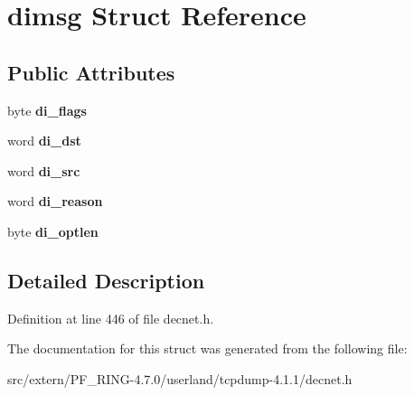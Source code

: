 \hypertarget{structdimsg}{
\section{dimsg Struct Reference}
\label{structdimsg}
}
\subsection*{Public Attributes}
\begin{DoxyCompactItemize}
\item 
\hypertarget{structdimsg_af8a0cd80c4a2249f8b9d07f4bb887a44}{
byte {\bfseries di\_\-flags}}
\label{structdimsg_af8a0cd80c4a2249f8b9d07f4bb887a44}

\item 
\hypertarget{structdimsg_a86b7a145fd3457dd4d597d58d6c0cc15}{
word {\bfseries di\_\-dst}}
\label{structdimsg_a86b7a145fd3457dd4d597d58d6c0cc15}

\item 
\hypertarget{structdimsg_a99632029f82fc88e3ba75623f702b6ef}{
word {\bfseries di\_\-src}}
\label{structdimsg_a99632029f82fc88e3ba75623f702b6ef}

\item 
\hypertarget{structdimsg_a2065d6129008102f1dac6d47208359b6}{
word {\bfseries di\_\-reason}}
\label{structdimsg_a2065d6129008102f1dac6d47208359b6}

\item 
\hypertarget{structdimsg_ae6c8caed90f25e7735db7e1f500d3b8f}{
byte {\bfseries di\_\-optlen}}
\label{structdimsg_ae6c8caed90f25e7735db7e1f500d3b8f}

\end{DoxyCompactItemize}


\subsection{Detailed Description}


Definition at line 446 of file decnet.h.



The documentation for this struct was generated from the following file:\begin{DoxyCompactItemize}
\item 
src/extern/PF\_\-RING-\/4.7.0/userland/tcpdump-\/4.1.1/decnet.h\end{DoxyCompactItemize}
